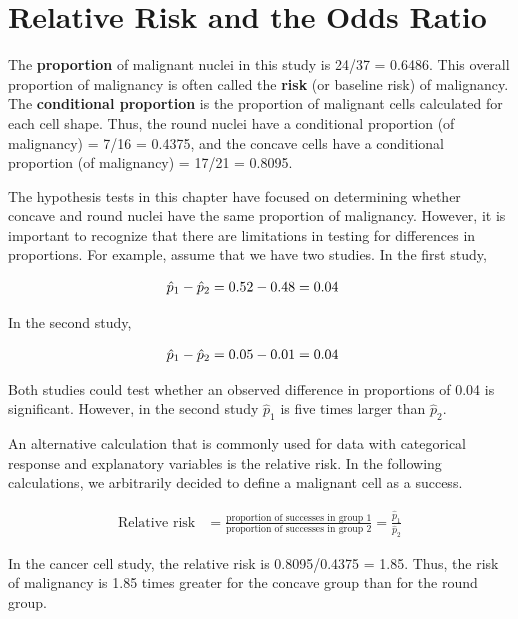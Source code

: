 \documentclass[
]{book}
\begin{document}
\hypertarget{relative-risk-and-the-odds-ratio}{%
\section{Relative Risk and the Odds Ratio}\label{relative-risk-and-the-odds-ratio}}

The \textbf{proportion} of malignant nuclei in this study is 24/37 = 0.6486. This overall proportion of malignancy is often called the \textbf{risk} (or baseline risk) of malignancy. The \textbf{conditional proportion} is the proportion of malignant cells calculated for each cell shape. Thus, the round nuclei have a conditional proportion (of malignancy) = 7/16 = 0.4375, and the concave cells have a conditional proportion (of malignancy) = 17/21 = 0.8095.

The hypothesis tests in this chapter have focused on determining whether concave and round nuclei have the same proportion of malignancy. However, it is important to recognize that there are limitations in testing for differences in proportions. For example, assume that we have two studies. In the first study,

\begin{align}
\hat p_1 - \hat p_2 &= 0.52 - 0.48 = 0.04
\notag
\end{align}

In the second study,

\begin{align}
\hat p_1 - \hat p_2 &= 0.05 - 0.01 = 0.04 
\notag
\end{align}

Both studies could test whether an observed difference in proportions of 0.04 is significant. However, in the second study \emph{\(\hat p_1\)} is five times larger than \emph{\(\hat p_2\)}.

An alternative calculation that is commonly used for data with categorical response and explanatory variables is the relative risk. In the following calculations, we arbitrarily decided to define a malignant cell as a success.

\begin{align}\label{5.4}
\text{Relative risk} &= \frac{\text{proportion of successes in group 1}}{\text{proportion of successes in group 2}} = \frac{\hat p_1}{\hat p_2} \tag{5.4}
\end{align}

In the cancer cell study, the relative risk is 0.8095/0.4375 = 1.85. Thus, the risk of malignancy is 1.85 times greater for the concave group than for the round group.
\end{document}

